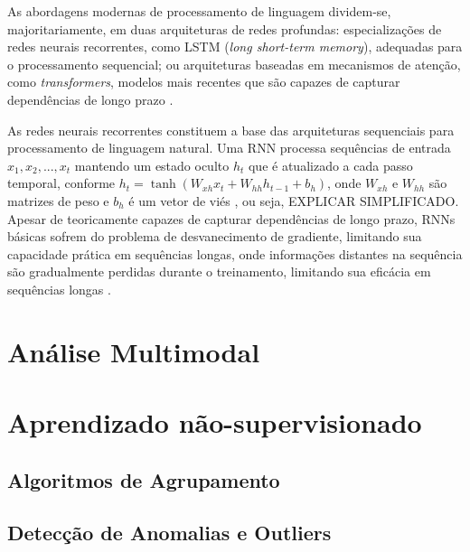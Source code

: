 As abordagens modernas de processamento de linguagem dividem-se, majoritariamente, em duas arquiteturas de redes profundas: especializações de redes neurais recorrentes, como LSTM (\textit{long short-term memory}), adequadas para o processamento sequencial; ou arquiteturas baseadas em mecanismos de atenção, como \textit{transformers}, modelos mais recentes que são capazes de capturar dependências de longo prazo \cite{nlp2}.

As redes neurais recorrentes constituem a base das arquiteturas sequenciais para processamento de linguagem natural. Uma RNN processa sequências de entrada $x_1, x_2, ..., x_{t}$ mantendo um estado oculto $h_{t}$ que é atualizado a cada passo temporal, conforme $h_{t} = \tanh(W_{xh}x_{t} + W_{hh}h_{t-1} + b_{h})$, onde $W_{xh}$ e $W_{hh}$ são matrizes de peso e $b_{h}$ é um vetor de viés \cite{lstm}, ou seja, EXPLICAR SIMPLIFICADO. Apesar de teoricamente capazes de capturar dependências de longo prazo, RNNs básicas sofrem do problema de desvanecimento de gradiente, limitando sua capacidade prática em sequências longas, onde informações distantes na sequência são gradualmente perdidas durante o treinamento, limitando sua eficácia em sequências longas \cite{nlp}.

\section{Análise Multimodal}



\section{Aprendizado não-supervisionado}





\subsection{Algoritmos de Agrupamento}


\subsection{Detecção de Anomalias e Outliers}